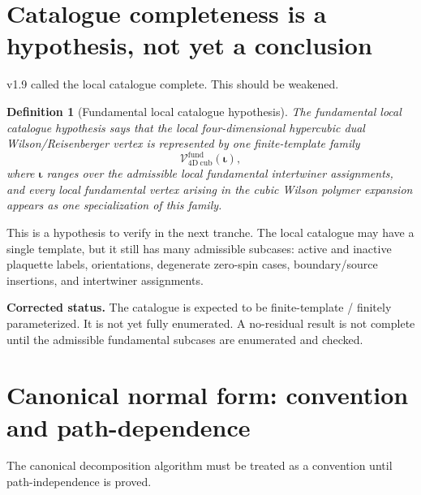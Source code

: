 \documentclass[11pt]{article}
\newtheorem{definition}{Definition}
\begin{document}
\section{Catalogue completeness is a hypothesis, not yet a conclusion}

v1.9 called the local catalogue complete. This should be weakened.

\begin{definition}[Fundamental local catalogue hypothesis]
The fundamental local catalogue hypothesis says that the local four-dimensional hypercubic dual Wilson/Reisenberger vertex is represented by one finite-template family
\[
  \mathcal V_{\mathrm{4D\ cub}}^{\mathrm{fund}}(\boldsymbol\iota),
\]
where $\boldsymbol\iota$ ranges over the admissible local fundamental intertwiner assignments, and every local fundamental vertex arising in the cubic Wilson polymer expansion appears as one specialization of this family.
\end{definition}

This is a hypothesis to verify in the next tranche. The local catalogue may have a single template, but it still has many admissible subcases: active and inactive plaquette labels, orientations, degenerate zero-spin cases, boundary/source insertions, and intertwiner assignments.

\begin{claimbox}
\textbf{Corrected status.} The catalogue is expected to be finite-template / finitely parameterized. It is not yet fully enumerated. A no-residual result is not complete until the admissible fundamental subcases are enumerated and checked.
\end{claimbox}

\section{Canonical normal form: convention and path-dependence}

The canonical decomposition algorithm must be treated as a convention until path-independence is proved.
\end{document}
